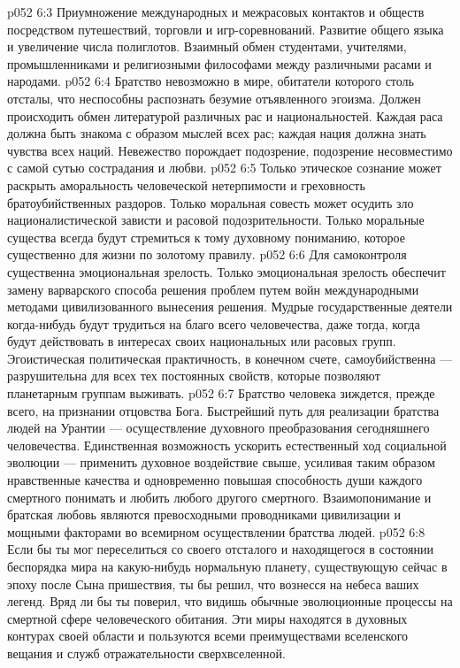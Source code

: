 \vs p052 6:3 \bibnobreakspace {} Приумножение международных и межрасовых контактов и обществ посредством путешествий, торговли и игр\hyp{}соревнований. Развитие общего языка и увеличение числа полиглотов. Взаимный обмен студентами, учителями, промышленниками и религиозными философами между различными расами и народами.
\vs p052 6:4 \bibnobreakspace {} Братство невозможно в мире, обитатели которого столь отсталы, что неспособны распознать безумие отъявленного эгоизма. Должен происходить обмен литературой различных рас и национальностей. Каждая раса должна быть знакома с образом мыслей всех рас; каждая нация должна знать чувства всех наций. Невежество порождает подозрение, подозрение несовместимо с самой сутью сострадания и любви.
\vs p052 6:5 \bibnobreakspace {} Только этическое сознание может раскрыть аморальность человеческой нетерпимости и греховность братоубийственных раздоров. Только моральная совесть может осудить зло националистической зависти и расовой подозрительности. Только моральные существа всегда будут стремиться к тому духовному пониманию, которое существенно для жизни по золотому правилу.
\vs p052 6:6 \bibnobreakspace {} Для самоконтроля существенна эмоциональная зрелость. Только эмоциональная зрелость обеспечит замену варварского способа решения проблем путем войн международными методами цивилизованного вынесения решения. Мудрые государственные деятели когда\hyp{}нибудь будут трудиться на благо всего человечества, даже тогда, когда будут действовать в интересах своих национальных или расовых групп. Эгоистическая политическая практичность, в конечном счете, самоубийственна --- разрушительна для всех тех постоянных свойств, которые позволяют планетарным группам выживать.
\vs p052 6:7 \bibnobreakspace {} Братство человека зиждется, прежде всего, на признании отцовства Бога. Быстрейший путь для реализации братства людей на Урантии --- осуществление духовного преобразования сегодняшнего человечества. Единственная возможность ускорить естественный ход социальной эволюции --- применить духовное воздействие свыше, усиливая таким образом нравственные качества и одновременно повышая способность души каждого смертного понимать и любить любого другого смертного. Взаимопонимание и братская любовь являются превосходными проводниками цивилизации и мощными факторами во всемирном осуществлении братства людей.
\vs p052 6:8 \pc Если бы ты мог переселиться со своего отсталого и находящегося в состоянии беспорядка мира на какую\hyp{}нибудь нормальную планету, существующую сейчас в эпоху после Сына пришествия, ты бы решил, что вознесся на небеса ваших легенд. Вряд ли бы ты поверил, что видишь обычные эволюционные процессы на смертной сфере человеческого обитания. Эти миры находятся в духовных контурах своей области и пользуются всеми преимуществами вселенского вещания и служб отражательности сверхвселенной.

